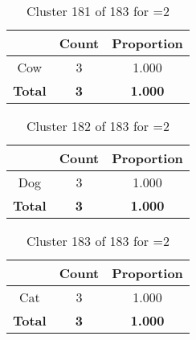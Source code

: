 \begin{table}[ht!]
\centering
\begin{tabular}{|c|c|c|}
\hline
\bf \Spec{} &\bf Count &\bf Proportion\\ \hline \hline
Cow & 3 & 1.000\\ \hline
\hline
\bf Total & \bf 3 & \bf 1.000\\ \hline
\end{tabular}
\label{tab:cluster:181:2}
\caption{Cluster 181 of 183 for \minneigh{}=2}
\end{table}

\begin{table}[ht!]
\centering
\begin{tabular}{|c|c|c|}
\hline
\bf \Spec{} &\bf Count &\bf Proportion\\ \hline \hline
Dog & 3 & 1.000\\ \hline
\hline
\bf Total & \bf 3 & \bf 1.000\\ \hline
\end{tabular}
\label{tab:cluster:182:2}
\caption{Cluster 182 of 183 for \minneigh{}=2}
\end{table}

\begin{table}[ht!]
\centering
\begin{tabular}{|c|c|c|}
\hline
\bf \Spec{} &\bf Count &\bf Proportion\\ \hline \hline
Cat & 3 & 1.000\\ \hline
\hline
\bf Total & \bf 3 & \bf 1.000\\ \hline
\end{tabular}
\label{tab:cluster:183:2}
\caption{Cluster 183 of 183 for \minneigh{}=2}
\end{table}

